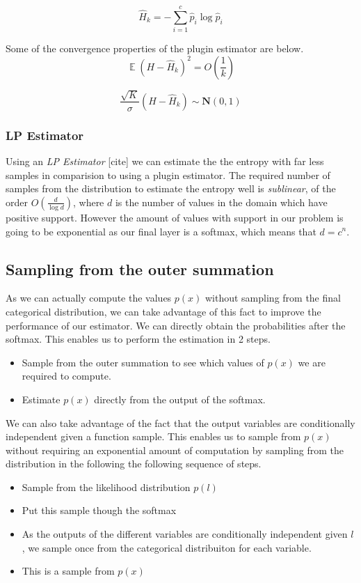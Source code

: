 \documentclass[12pt, a4paper]{report}
\theoremstyle{definition}
\DeclareMathOperator{\E}{\mathbb{E}}
\begin{document}
$$\hat{H}_k = - \sum_{i=1}^{c} \hat{p}_i \log{\hat{p}_i}$$


Some of the convergence properties of the plugin estimator are below.
$$\E \left(H - \hat{H}_k \right)^2 = O \left ( \frac{1}{k} \right) $$

$$ \frac{\sqrt{K}}{\sigma} \left(H - \hat{H}_k \right) \sim \mathbf{N} \left(0, 1 \right) $$



\subsubsection{LP Estimator}

Using an \textit{LP Estimator} [cite] we can estimate the the entropy with far less samples in comparision to using a plugin estimator. The required number of samples from the distribution to estimate the entropy well is \textit{sublinear}, of the order $O \left( \frac{d}{\log{d}}\right)$, where $d$ is the number of values in the domain which have positive support. However the amount of values with support in our problem is going to be exponential as our final layer is a softmax, which means that $d = c^n$.


\subsection{Sampling from the outer summation}

As we can actually compute the values $p(x)$ without sampling from the final categorical distribution, we can take advantage of this fact to improve the performance of our estimator. We can directly obtain the probabilities after the softmax. This enables us to perform the estimation in 2 steps.

\begin{itemize}
    \item Sample from the outer summation to see which values of $p(x)$ we are required to compute.
    \item Estimate $p(x)$ directly from the output of the softmax.
\end{itemize}

We can also take advantage of the fact that the output variables are conditionally independent given a function sample. This enables us to sample from $p(x)$ without requiring an exponential amount of computation by sampling from the distribution in the following the following sequence of steps.

\begin{itemize}
    \item Sample from the likelihood distribution $p(l)$
    \item Put this sample though the softmax
    \item As the outputs of the different variables are conditionally independent given $l$, we sample once from the categorical distribuiton for each variable.
    \item This is a sample from $p(x)$
\end{itemize}
\end{document}
